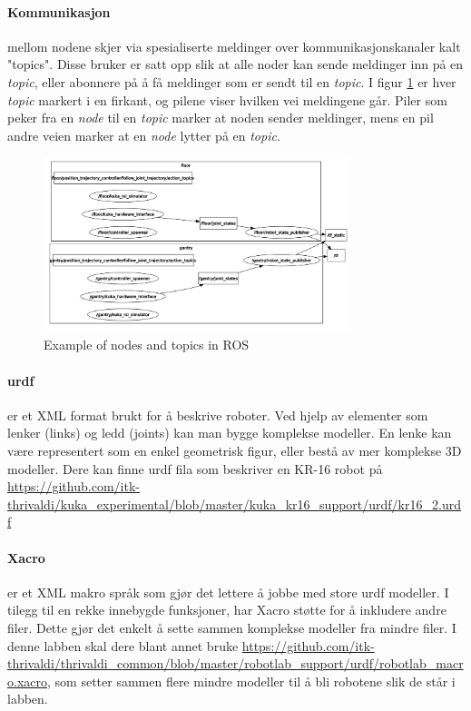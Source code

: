 \documentclass{article}
\begin{document}
\paragraph{Kommunikasjon} mellom nodene skjer via spesialiserte meldinger over kommunikasjonskanaler kalt "topics". Disse bruker er satt opp slik at alle noder kan sende meldinger inn på en \textit{topic}, eller abonnere på å få meldinger som er sendt til en \textit{topic}. I figur \ref{fig:ros_topics} er hver \textit{topic} markert i en firkant, og pilene viser hvilken vei meldingene går. Piler som peker fra en \textit{node} til en \textit{topic} marker at noden sender meldinger, mens en pil andre veien marker at en \textit{node} lytter på en \textit{topic}.

\begin{figure}[!htbp]
    \centering
    \includegraphics[angle=90,width=0.8\textwidth,height=0.8\textheight,keepaspectratio]{img/ros_topics}
    \caption{Example of nodes and topics in ROS}
    \label{fig:ros_topics}
\end{figure}


\paragraph{\gls{urdf}} er et XML format brukt for å beskrive roboter. Ved hjelp av elementer som lenker (links) og ledd (joints) kan man bygge komplekse modeller. En lenke kan være representert som en enkel geometrisk figur, eller bestå av mer komplekse 3D modeller. Dere kan finne \gls{urdf} fila som beskriver en KR-16 robot på \url{https://github.com/itk-thrivaldi/kuka_experimental/blob/master/kuka_kr16_support/urdf/kr16_2.urdf}  

\paragraph{Xacro} er et XML makro språk som gjør det lettere å jobbe med store \gls{urdf} modeller. I tilegg til en rekke innebygde funksjoner, har Xacro støtte for å inkludere andre filer. Dette gjør det enkelt å sette sammen komplekse modeller fra mindre filer. I denne labben skal dere blant annet bruke \url{https://github.com/itk-thrivaldi/thrivaldi_common/blob/master/robotlab_support/urdf/robotlab_macro.xacro}, som setter sammen flere mindre modeller til å bli robotene slik de står i labben.
\end{document}

